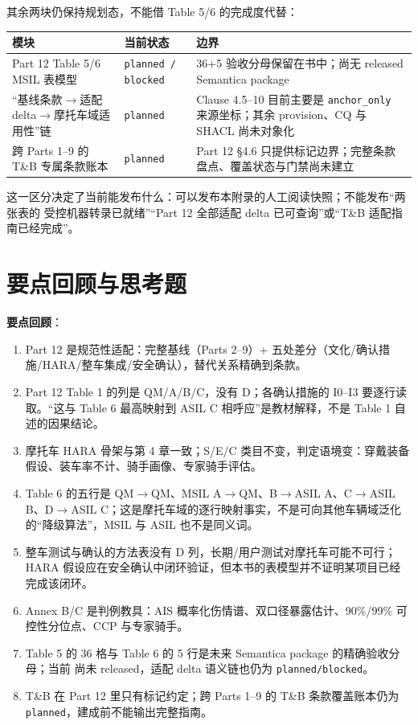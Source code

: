 其余两块仍保持规划态，不能借 Table 5/6 的完成度代替：

\begin{center}
\begingroup\small
\setlength{\tabcolsep}{4pt}
\begin{tabularx}{\linewidth}{@{}XXX@{}}
\toprule
模块 & 当前状态 & 边界 \\
\midrule
Part 12 Table 5/6 MSIL 表模型 & \allowbreak{}\texttt{planned \allowbreak{}/\allowbreak{} \allowbreak{}blocked}\allowbreak{} & 36+5 验收分母保留在书中；尚无 released Semantica package \\
“基线条款\(\rightarrow\)适配 delta\(\rightarrow\)摩托车域适用性”链 & \nolinkurl{planned} & Clause 4.5–10 目前主要是 \nolinkurl{anchor_only} 来源坐标；其余 provision、CQ 与 SHACL 尚未对象化 \\
跨 Parts 1–9 的 T\&B 专属条款账本 & \nolinkurl{planned} & Part 12 §4.6 只提供标记边界；完整条款盘点、覆盖状态与门禁尚未建立 \\
\bottomrule
\end{tabularx}
\endgroup
\end{center}

这一区分决定了当前能发布什么：可以发布本附录的人工阅读快照；不能发布“两张表的
受控机器转录已就绪”“Part 12 全部适配 delta 已可查询”或“T\&B 适配指南已经完成”。

\section{要点回顾与思考题}

\textbf{要点回顾}：

\begin{enumerate}
\item Part 12 是规范性适配：完整基线（Parts 2–9）+ 五处差分（文化/确认措施/HARA/整车集成/安全确认），替代关系精确到条款。
\item Part 12 Table 1 的列是 QM/A/B/C，没有 D；各确认措施的 I0–I3 要逐行读取。“这与 Table 6 最高映射到 ASIL C 相呼应”是教材解释，不是 Table 1 自述的因果结论。
\item 摩托车 HARA 骨架与第 4 章一致；S/E/C 类目不变，判定语境变：穿戴装备假设、装车率不计、骑手画像、专家骑手评估。
\item Table 6 的五行是 QM\(\rightarrow\)QM、MSIL A\(\rightarrow\)QM、B\(\rightarrow\)ASIL A、C\(\rightarrow\)ASIL B、D\(\rightarrow\)ASIL C；这是摩托车域的逐行映射事实，不是可向其他车辆域泛化的“降级算法”，MSIL 与 ASIL 也不是同义词。
\item 整车测试与确认的方法表没有 D 列，长期/用户测试对摩托车可能不可行；HARA 假设应在安全确认中闭环验证，但本书的表模型并不证明某项目已经完成该闭环。
\item Annex B/C 是判例教具：AIS 概率化伤情谱、双口径暴露估计、90\%/99\% 可控性分位点、CCP 与专家骑手。
\item Table 5 的 36 格与 Table 6 的 5 行是未来 Semantica package 的精确验收分母；当前
   尚未 released，适配 delta 语义链也仍为 \nolinkurl{planned/blocked}。
\item T\&B 在 Part 12 里只有标记约定；跨 Parts 1–9 的 T\&B 条款覆盖账本仍为 \nolinkurl{planned}，建成前不能输出完整指南。
\end{enumerate}

